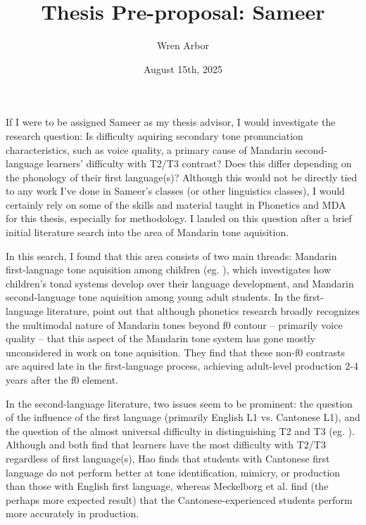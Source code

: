 \documentclass[11pt]{article}
\title{Thesis Pre-proposal: Sameer}
\author{Wren Arbor}
\date{August 15th, 2025}
\begin{document}
\maketitle
If I were to be assigned Sameer as my thesis advisor, I would investigate the research question: Is difficulty aquiring secondary tone pronunciation characteristics, such as voice quality, a primary cause of Mandarin second-language learners' difficulty with T2/T3 contrast?  Does this differ depending on the phonology of their first language(s)?  Although this would not be directly tied to any work I've done in Sameer's classes (or other linguistics classes), I would certainly rely on some of the skills and material taught in Phonetics and MDA for this thesis, especially for methodology. I landed on this question after a brief initial literature search into the area of Mandarin tone aquisition. 

In this search, I found that this area consists of two main threads: Mandarin first-language tone aquisition among children (eg. \cite{rhee_going_2021}), which investigates how children's tonal systems develop over their language development, and Mandarin second-language tone aquisition among young adult students. In the first-language literature, \textcite{rhee_going_2021} point out that although phonetics research broadly recognizes the multimodal nature of Mandarin tones beyond f0 contour -- primarily voice quality -- that this aspect of the Mandarin tone system has gone mostly unconsidered in work on tone aquisition. They find that these non-f0 contrasts are aquired late in the first-language process, achieving adult-level production 2-4 years after the f0 element. 

In the second-language literature, two issues seem to be prominent: the question of the influence of the first language (primarily English L1 vs. Cantonese L1), and the question of the almost universal difficulty in distinguishing T2 and T3 (eg. \cite{hao_second_2012, meckelborg_acquisition_2024}). Although \textcite{hao_second_2012} and \textcite{meckelborg_acquisition_2024} both find that learners have the most difficulty with T2/T3 regardless of first language(s), Hao finds that students with Cantonese first language do not perform better at tone identification, mimicry, or production than those with English first language, whereas Meckelborg et al. find (the perhaps more expected result) that the Cantonese-experienced students perform more accurately in production.
\end{document}
